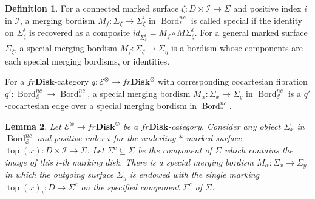 \documentclass[reqno]{amsart}
\newtheorem{lemma}{Lemma}[section]
\theoremstyle{definition}
\newtheorem{definition}[lemma]{Definition}
\newcommand{\mcl}[1]{\mathcal{#1}}
\newcommand{\msc}[1]{\mathscr{#1}}
\newcommand{\opn}[1]{\operatorname{#1}}
\newcommand{\ot}{\otimes}
\newcommand{\Disk}{\mathbf{Disk}}
\DeclareMathOperator{\Bord}{Bord}
\renewcommand{\1}{\mathbf{1}}
\begin{document}
\begin{definition}\label{def:special_merge}
For a connected marked surface $\zeta:D\times \mcl{I}\to \Sigma$ and positive index $i$ in $\mcl{I}$, a merging bordism $M_f:\Sigma_{\zeta}\to \Sigma^i_{\zeta}$ in $\Bord_{\ast}^{nc}$ is called special if the identity on $\Sigma^i_{\zeta}$ is recovered as a composite $id_{\Sigma^i_{\zeta}}=M_f\circ M\Sigma^i_{\zeta}$.  For a general marked surface $\Sigma_{\zeta}$, a special merging bordism $M_f:\Sigma_{\zeta}\to \Sigma_{\eta}$ is a bordism whose components are each special merging bordisms, or identities.

For a $fr\Disk$-category $q:\msc{E}^{\ot}\to fr\Disk^{\ot}$ with corresponding cocartesian fibration $q':\Bord_{\msc{E}}^{nc}\to \Bord_{\ast}^{nc}$, a special merging bordism $M_{\alpha}:\Sigma_x\to \Sigma_y$ in $\Bord_{\msc{E}}^{nc}$ is a $q'$-cocartesian edge over a special merging bordism in $\Bord_{\ast}^{nc}$.
\end{definition}

\begin{lemma}
Let $\msc{E}^{\ot}\to fr\Disk^{\ot}$ be a $fr\Disk$-category. Consider any object $\Sigma_x$ in $\Bord^{nc}_{\msc{E}}$ and positive index $i$ for the underling $\ast$-marked surface $\opn{top}(x):D\times \mcl{I}\to \Sigma$.  Let $\Sigma^c\subseteq \Sigma$ be the component of $\Sigma$ which contains the image of this $i$-th marking disk. There is a special merging bordism $M_{\alpha}:\Sigma_x\to \Sigma_y$ in which the outgoing surface $\Sigma_y$ is endowed with the single marking $\opn{top}(x)_i:D\to \Sigma^c$ on the specified component $\Sigma^c$ of $\Sigma$. 
\end{lemma}
\end{document}
